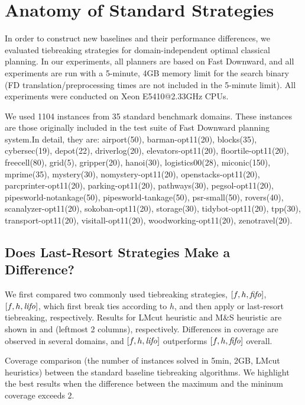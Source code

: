 \section{Anatomy of Standard Strategies}
\label{sec:eval-common-strategies}

In order to construct new baselines and their performance differences,
we evaluated tiebreaking strategies for domain-independent optimal
classical planning.  In our experiments, all planners are based on Fast
Downward, and all experiments are run with a 5-minute,
4GB memory limit for the search binary (FD translation/preprocessing
times are not included in the 5-minute limit).  All experiments were
conducted on Xeon E5410@2.33GHz CPUs. 

We used 1104 instances from 35 standard benchmark domains. These
instances are those originally included in the test suite of Fast
Downward planning system.In detail, they are: airport(50),
barman-opt11(20), blocks(35), cybersec(19), depot(22), driverlog(20),
elevators-opt11(20), floortile-opt11(20), freecell(80), grid(5),
gripper(20), hanoi(30), logistics00(28), miconic(150), mprime(35),
mystery(30), nomystery-opt11(20), openstacks-opt11(20),
parcprinter-opt11(20), parking-opt11(20), pathways(30),
pegsol-opt11(20), pipesworld-notankage(50), pipesworld-tankage(50),
psr-small(50), rovers(40), scanalyzer-opt11(20), sokoban-opt11(20),
storage(30), tidybot-opt11(20), tpp(30), transport-opt11(20),
visitall-opt11(20), woodworking-opt11(20), zenotravel(20).

\subsection{Does Last-Resort Strategies Make a Difference?}

We first compared two commonly used tiebreaking strategies, $[f,h,{\mbox{\textit{fifo}}}]$, $[f,h,{\mbox{\textit{lifo}}}]$, which
first break ties according to $h$, and then apply \fifo or \lifo
last-resort tiebreaking, respectively.
Results for LMcut heuristic \cite{Helmert2009} and M\&S heuristic \cite{HelmertHHN14} are
shown in  and 
(leftmost 2 columns), respectively.
Differences in coverage are observed in several domains, and
$[f,h,{\mbox{\textit{lifo}}}]$ outperforms $[f,h,{\mbox{\textit{fifo}}}]$ overall.

\begin{table}[htbp]
 {
 \centering
 
 \caption{
 Coverage comparison (the number of instances solved in 5min, 2GB, LMcut
 heuristics) between
 the standard baseline tiebreaking algorithms. We highlight the
 best results when the difference between the maximum and the mininum coverage exceeds 2.
 }
 \label{tbl:lmcut-ipc-full}
 }
\end{table}


